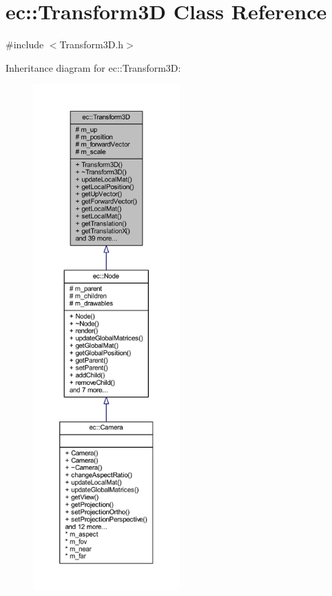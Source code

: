 \hypertarget{classec_1_1_transform3_d}{}\section{ec\+:\+:Transform3D Class Reference}
\label{classec_1_1_transform3_d}


{\ttfamily \#include $<$Transform3\+D.\+h$>$}



Inheritance diagram for ec\+:\+:Transform3D\+:\nopagebreak
\begin{figure}[H]
\begin{center}
\leavevmode
\includegraphics[height=550pt]{classec_1_1_transform3_d__inherit__graph}
\end{center}
\end{figure}


